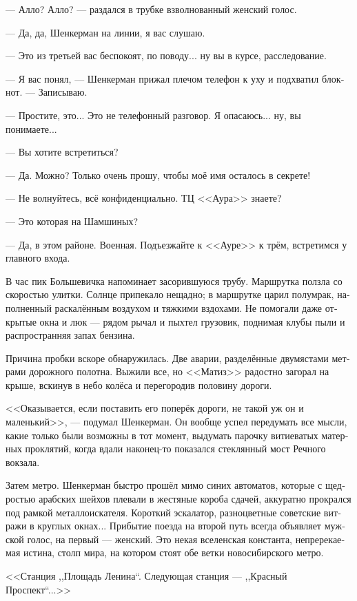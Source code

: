 \documentclass[a5paper,12pt,fleqn]{extbook}\usepackage{cooltooltips}\usepackage{polyglossia}\setdefaultlanguage[babelshorthands=true]{russian}\setotherlanguage{english}\defaultfontfeatures{Ligatures=TeX,Mapping=tex-text} \usepackage{xcolor}\definecolor{lightgray}{HTML}{bbbbbb}\color{lightgray}\newcommand{\ml}[3]{\textenglish{\textcolor{black}{#3}}}
\newcommand{\asterism}{\vspace{1em}{\centering\Large\bfseries$\ast~\ast~\ast$\par}\vspace{1em}}
\begin{document}
--- Алло? Алло? --- раздался в трубке взволнованный женский голос.

--- Да, да, Шенкерман на линии, я вас слушаю.

--- Это из третьей вас беспокоят, по поводу... ну вы в курсе, расследование.

--- Я вас понял, --- Шенкерман прижал плечом телефон к уху и подхватил блокнот.
--- Записываю.

--- Простите, это...
Это не телефонный разговор.
Я опасаюсь... ну, вы понимаете...

--- Вы хотите встретиться?

--- Да.
Можно?
Только очень прошу, чтобы моё имя осталось в секрете!

--- Не волнуйтесь, всё конфиденциально.
ТЦ <<Аура>> знаете?

--- Это которая на Шамшиных?

--- Да, в этом районе.
Военная.
Подъезжайте к <<Ауре>> к трём, встретимся у главного входа.

\asterism

В час пик Большевичка напоминает засорившуюся трубу.
Маршрутка ползла со скоростью улитки.
Солнце припекало нещадно;
в маршрутке царил полумрак, наполненный раскалённым воздухом и тяжкими вздохами.
Не помогали даже открытые окна и люк --- рядом рычал и пыхтел грузовик, поднимая клубы пыли и распространняя запах бензина.

Причина пробки вскоре обнаружилась.
Две аварии, разделённые двумястами метрами дорожного полотна.
Выжили все, но <<Матиз>> радостно загорал на крыше, вскинув в небо колёса и перегородив половину дороги.

<<Оказывается, если поставить его поперёк дороги, не такой уж он и маленький>>, --- подумал Шенкерман.
Он вообще успел передумать все мысли, какие только были возможны в тот момент, выдумать парочку витиеватых матерных проклятий, когда вдали наконец-то показался стеклянный мост Речного вокзала.

Затем метро.
Шенкерман быстро прошёл мимо синих автоматов, которые с щедростью арабских шейхов плевали в жестяные короба сдачей, аккуратно прокрался под рамкой металлоискателя.
Короткий эскалатор, разноцветные советские витражи в круглых окнах...
Прибытие поезда на второй путь всегда объявляет мужской голос, на первый --- женский.
Это некая вселенская константа, непререкаемая истина, столп мира, на котором стоят обе ветки новосибирского метро.

<<Станция ,,Площадь Ленина``. Следующая станция --- ,,Красный Проспект``...>>
\end{document}
